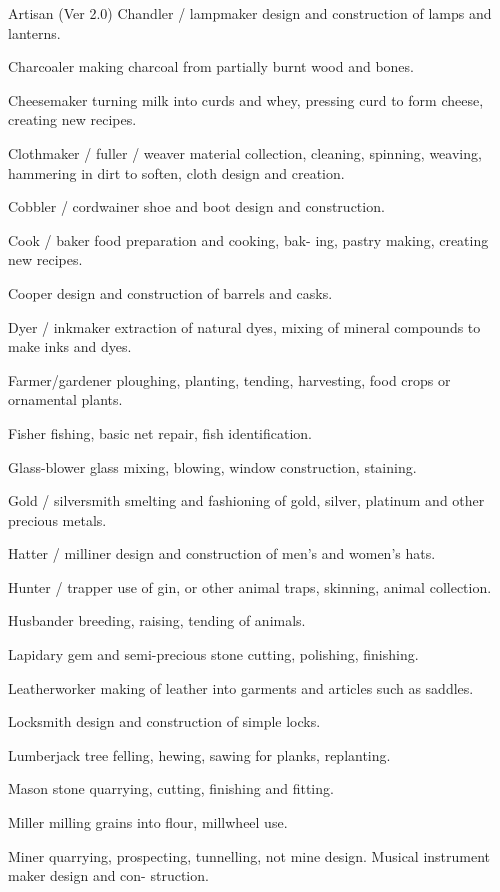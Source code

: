\begin{Chapter}{Artisan (Ver 2.0)}
Chandler / lampmaker design and construction of 
lamps and lanterns. 

Charcoaler  making  charcoal  from  partially  burnt 
wood and bones. 

Cheesemaker  turning  milk  into  curds  and  whey, 
pressing curd to form cheese, creating new recipes. 

Clothmaker  /  fuller  /  weaver  material  collection, 
cleaning,  spinning,  weaving,  hammering  in  dirt  to 
soften, cloth design and creation. 

Cobbler  /  cordwainer  shoe  and  boot  design  and 
construction. 

Cook  /  baker  food  preparation  and  cooking,  bak-
ing, pastry making, creating new recipes. 

Cooper  design  and  construction  of  barrels  and 
casks. 

Dyer / inkmaker extraction of natural dyes, mixing 
of mineral compounds to make inks and dyes. 

Farmer/gardener  ploughing,  planting,  tending, 
harvesting, food crops or ornamental plants. 

Fisher fishing, basic net repair, fish identification. 

Glass-blower  glass  mixing,  blowing,  window 
construction, staining. 

Gold  /  silversmith  smelting  and  fashioning  of 
gold, silver, platinum and other precious metals. 

Hatter / milliner design and construction of men’s 
and women’s hats. 

Hunter / trapper use of gin, or other animal traps, 
skinning, animal collection. 

Husbander breeding, raising, tending of animals. 

Lapidary  gem  and  semi-precious  stone  cutting, 
polishing, finishing. 

Leatherworker  making  of  leather  into  garments 
and articles such as saddles. 

Locksmith  design  and  construction  of  simple 
locks. 

Lumberjack  tree  felling,  hewing,  sawing  for 
planks, replanting. 

Mason  stone  quarrying,  cutting,  finishing  and 
fitting. 

Miller milling grains into flour, millwheel use. 

Miner quarrying, prospecting, tunnelling, not mine 
design. Musical instrument maker design and con-
struction.  


\end{Chapter}
